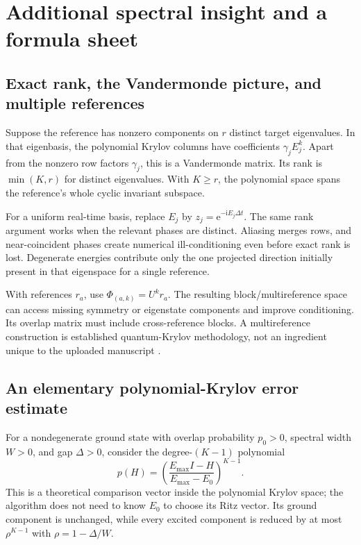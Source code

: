 \documentclass[11pt,a4paper,oneside]{report}
\newcommand{\I}{\mathrm i}
\newcommand{\e}{\mathrm e}
\begin{document}
\chapter{Additional spectral insight and a formula sheet}\label{app:spectral}
\section{Exact rank, the Vandermonde picture, and multiple references}
Suppose the reference has nonzero components on $r$ distinct target eigenvalues. In that eigenbasis, the polynomial Krylov columns have coefficients $\gamma_jE_j^k$. Apart from the nonzero row factors $\gamma_j$, this is a Vandermonde matrix. Its rank is $\min(K,r)$ for distinct eigenvalues. With $K\ge r$, the polynomial space spans the reference's whole cyclic invariant subspace.

For a uniform real-time basis, replace $E_j$ by $z_j=\e^{-\I E_j\Delta t}$. The same rank argument works when the relevant phases are distinct. Aliasing merges rows, and near-coincident phases create numerical ill-conditioning even before exact rank is lost. Degenerate energies contribute only the one projected direction initially present in that eigenspace for a single reference.

With references $r_a$, use $\Phi_{(a,k)}=U^kr_a$. The resulting block/multireference space can access missing symmetry or eigenstate components and improve conditioning. Its overlap matrix must include cross-reference blocks. A multireference construction is established quantum-Krylov methodology, not an ingredient unique to the uploaded manuscript \cite{stair}.

\section{An elementary polynomial-Krylov error estimate}
For a nondegenerate ground state with overlap probability $p_0>0$, spectral width $W>0$, and gap $\Delta>0$, consider the degree-$(K-1)$ polynomial
\begin{equation}
p(H)=\left(\frac{E_{\max}I-H}{E_{\max}-E_0}\right)^{K-1}.
\end{equation}
This is a theoretical comparison vector inside the polynomial Krylov space; the algorithm does not need to know $E_0$ to choose its Ritz vector. Its ground component is unchanged, while every excited component is reduced by at most $\rho^{K-1}$ with $\rho=1-\Delta/W$.
\end{document}

